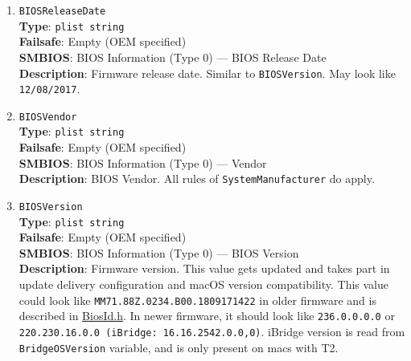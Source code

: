 \documentclass[]{article}
\begin{document}
\begin{enumerate}

\item
  \texttt{BIOSReleaseDate}\\
  \textbf{Type}: \texttt{plist\ string}\\
  \textbf{Failsafe}: Empty (OEM specified)\\
  \textbf{SMBIOS}: BIOS Information (Type 0) --- BIOS Release Date\\
  \textbf{Description}: Firmware release date. Similar to
  \texttt{BIOSVersion}. May look like \texttt{12/08/2017}.
\item
  \texttt{BIOSVendor}\\
  \textbf{Type}: \texttt{plist\ string}\\
  \textbf{Failsafe}: Empty (OEM specified)\\
  \textbf{SMBIOS}: BIOS Information (Type 0) --- Vendor\\
  \textbf{Description}: BIOS Vendor. All rules of
  \texttt{SystemManufacturer} do apply.
\item
  \texttt{BIOSVersion}\\
  \textbf{Type}: \texttt{plist\ string}\\
  \textbf{Failsafe}: Empty (OEM specified)\\
  \textbf{SMBIOS}: BIOS Information (Type 0) --- BIOS Version\\
  \textbf{Description}: Firmware version. This value gets updated and
  takes part in update delivery configuration and macOS version
  compatibility. This value could look like
  \texttt{MM71.88Z.0234.B00.1809171422} in older firmware and is
  described in
  \href{https://github.com/acidanthera/OpenCorePkg/blob/master/Include/Apple/Guid/BiosId.h}{BiosId.h}.
  In newer firmware, it should look like \texttt{236.0.0.0.0} or
  \texttt{220.230.16.0.0\ (iBridge:\ 16.16.2542.0.0,0)}. iBridge version
  is read from \texttt{BridgeOSVersion} variable, and is only present on
  macs with T2.


\end{enumerate}
\end{document}
